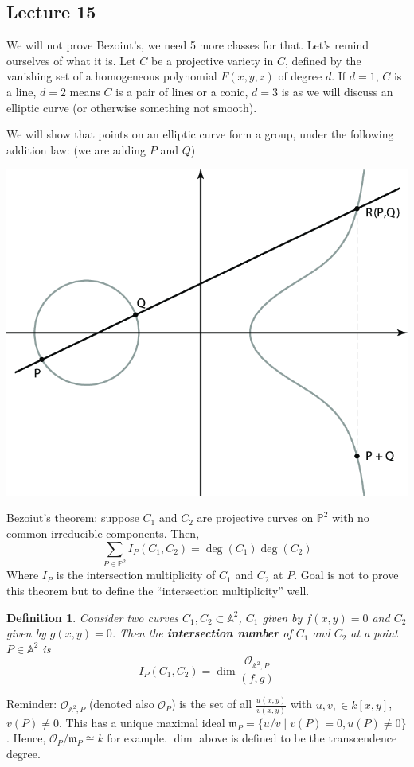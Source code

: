 \documentclass[12pt]{article}
\renewcommand{\P}{\mathbb{P}}
\newcommand{\A}{\mathbb{A}}
\newcommand{\m}{\mathfrak{m}}
\renewcommand{\O}{\mathcal{O}}
\newtheorem{definition}{Definition}[section]
\begin{document}
    \subsection{Lecture 15}
    We will not prove Bezoiut's, we need 5 more classes for that. Let's remind ourselves of what it is. Let $C$ be a projective variety in $C$, defined by the vanishing set of a homogeneous polynomial $F(x, y, z)$ of degree $d$. If $d = 1$, $C$ is a line, $d= 2$ means $C$ is a pair of lines or a conic, $d = 3$ is as we will discuss an elliptic curve (or otherwise something not smooth).\par
    We will show that points on an elliptic curve form a group, under the following addition law: (we are adding $P$ and $Q$)
    \begin{center}
        \includegraphics[width = 0.6\linewidth]{add_elliptic.png}
    \end{center}
    Bezoiut's theorem: suppose $C_1$ and $C_2$ are projective curves on $\P^2$ with no common irreducible components. Then,
    $$\sum_{P \in \P^2}I_P(C_1, C_2) = \deg(C_1)\deg(C_2)$$
    Where $I_P$ is the intersection multiplicity of $C_1$ and $C_2$ at $P$. Goal is not to prove this theorem but to define the ``intersection multiplicity'' well. \par
    \begin{definition}
        Consider two curves $C_1, C_2 \subset \A^2$, $C_1$ given by $f(x, y) = 0$ and $C_2$ given by $g(x, y) = 0$. Then the \textbf{intersection number} of $C_1$ and $C_2$ at a point $P \in \A^2$ is
        $$I_P(C_1, C_2) = \dim \frac{\O_{\A^2, P}}{(f, g)}$$
    \end{definition}
    Reminder: $\O_{\A^2, P}$ (denoted also $\O_P$) is the set of all $\frac{u(x, y)}{v(x, y)}$ with $u, v, \in k[x, y]$, $v(P) \neq 0$. This has a unique maximal ideal $\m_P = \{u/v \mid v(P) = 0, u(P) \neq 0\}$. Hence, $\O_P/\m_P \cong k$ for example. $\dim$ above is defined to be the transcendence degree. \par
\end{document}
